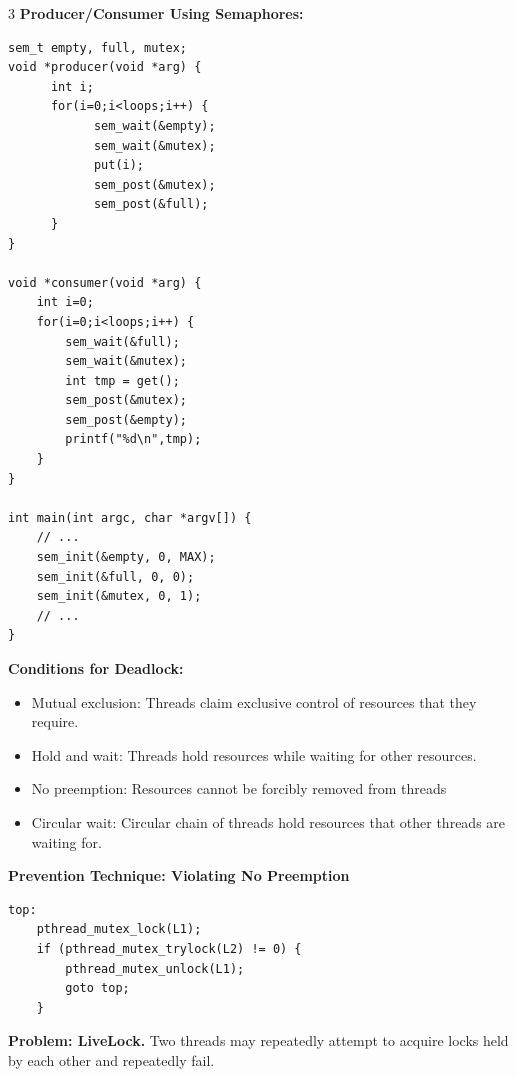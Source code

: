 \documentclass[8pt]{innovativeinnovation-cheatsheet}
\begin{document}
\begin{multicols*}{3}
\textbf{Producer/Consumer Using Semaphores:}
\begin{lstlisting}
sem_t empty, full, mutex;
void *producer(void *arg) {
      int i;
      for(i=0;i<loops;i++) {
            sem_wait(&empty);
            sem_wait(&mutex);
            put(i);
            sem_post(&mutex);
            sem_post(&full);
      }
}

void *consumer(void *arg) {
    int i=0;
    for(i=0;i<loops;i++) {
        sem_wait(&full);
        sem_wait(&mutex);
        int tmp = get();
        sem_post(&mutex);
        sem_post(&empty);
        printf("%d\n",tmp);
    }
}

int main(int argc, char *argv[]) {
    // ...
    sem_init(&empty, 0, MAX);
    sem_init(&full, 0, 0);
    sem_init(&mutex, 0, 1);
    // ...
}

\end{lstlisting}


\textbf{Conditions for Deadlock:}
\begin{itemize}
      \item Mutual exclusion: Threads claim exclusive control of resources that they require.
      \item Hold and wait: Threads hold resources while waiting for other resources.
      \item No preemption: Resources cannot be forcibly removed from threads
      \item Circular wait: Circular chain of threads hold resources that other threads are waiting for.
\end{itemize}

\textbf{Prevention Technique: Violating No Preemption}
\begin{lstlisting}
top:
    pthread_mutex_lock(L1);
    if (pthread_mutex_trylock(L2) != 0) {
        pthread_mutex_unlock(L1);
        goto top;
    }
\end{lstlisting}
\textbf{Problem: LiveLock.} Two threads may repeatedly attempt to acquire locks held by each other and repeatedly fail.


\newpage



\end{multicols*}
\end{document}
